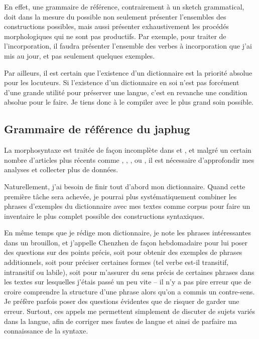 \documentclass[oldfontcommands,oneside,a4paper,11pt]{memoir}
\begin{document}
	En effet, une grammaire de référence, contrairement à un sketch grammatical, doit dans la mesure du possible non seulement présenter l'ensembles des constructions possibles, mais aussi présenter exhaustivement les procédés morphologiques qui ne sont pas productifs. Par exemple, pour traiter de l'incorporation, il faudra présenter l'ensemble des verbes à incorporation que j'ai mis au jour, et pas seulement quelques exemples. 
	
	Par ailleurs, il est certain que l'existence d'un dictionnaire est la priorité absolue pour les locuteurs. Si l'existence d'un dictionnaire en soi n'est pas forcément d'une grande utilité pour préserver une langue, c'est en revanche une condition absolue pour le faire. Je tiens donc à le compiler avec le plus grand soin possible.  
	
 
	
	
\subsection{Grammaire de référence du japhug}	 \label{grammaire}
La morphosyntaxe est traitée de façon incomplète dans \citet{jacques04these} et \citet{jacques08}, et malgré un certain nombre d'articles plus récents comme \citet{jacques10inverse}, \citet{jacques12incorp}, \citet{jacques12demotion},    \citet{jacques13harmonization} ou \citet{jacques14antipassive}, il est nécessaire d'approfondir mes analyses et collecter plus de données.

Naturellement, j'ai besoin de finir tout d'abord mon dictionnaire. Quand cette première tâche sera achevée, je pourrai plus systématiquement combiner les phrases d'exemples du dictionnaire avec mes textes comme corpus pour faire un inventaire le plus complet possible des constructions syntaxiques.  

En même temps que je rédige mon dictionnaire, je note les phrases intéressantes dans un brouillon, et j'appelle Chenzhen de façon hebdomadaire pour lui poser des questions sur des points précis, soit pour obtenir des exemples de phrases additionnels, soit pour préciser certaines formes (tel verbe est-il transitif, intransitif ou labile), soit pour m'assurer du sens précis de certaines phrases dans les textes sur lesquelles j'étais passé un peu vite -- il n'y a pas pire erreur que de croire comprendre la structure d'une phrase alors qu'on a commis un contre-sens. Je préfère parfois poser des questions évidentes que de risquer de garder une erreur. Surtout, ces appels me permettent simplement de discuter de sujets variés dans la langue, afin de corriger mes fautes de langue et ainsi de parfaire ma connaissance de la syntaxe.
\end{document}
